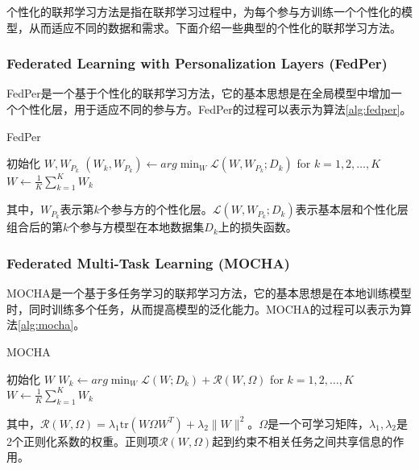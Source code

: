 个性化的联邦学习方法是指在联邦学习过程中，为每个参与方训练一个个性化的模型，从而适应不同的数据和需求。下面介绍一些典型的个性化的联邦学习方法。

\subsubsection{Federated Learning with Personalization Layers (FedPer)}

FedPer\cite{arivazhagan2019federated}是一个基于个性化的联邦学习方法，它的基本思想是在全局模型中增加一个个性化层，用于适应不同的参与方。FedPer的过程可以表示为算法\ref{alg:fedper}。

\begin{algorithm}[htbp]
\caption{FedPer}
\label{alg:fedper}
\begin{algorithmic}[1]
    \State 初始化 $W,W_{P_k}$
        \State $(W_k,W_{P_k}) \leftarrow arg\min_W \mathcal{L}(W,W_{P_k};D_k)$ for $k=1,2,\ldots,K$
        \State $W \leftarrow \frac{1}{K}\sum_{k=1}^K W_k$
    \EndFor
\end{algorithmic}
\end{algorithm}

其中，$W_{P_k}$表示第$k$个参与方的个性化层。$\mathcal{L}(W,W_{P_k};D_k)$表示基本层和个性化层组合后的第$k$个参与方模型在本地数据集$D_k$上的损失函数。

\subsubsection{Federated Multi-Task Learning (MOCHA)}

MOCHA\cite{smith2017federated}是一个基于多任务学习的联邦学习方法，它的基本思想是在本地训练模型时，同时训练多个任务，从而提高模型的泛化能力。MOCHA的过程可以表示为算法\ref{alg:mocha}。

\begin{algorithm}[htbp]
\caption{MOCHA}
\label{alg:mocha}
\begin{algorithmic}[1]
    \State 初始化 $W$
        \State $W_k \leftarrow arg\min_W \mathcal{L}(W;D_k)+\mathcal{R}(W,\Omega)$ for $k=1,2,\ldots,K$
        \State $W \leftarrow \frac{1}{K}\sum_{k=1}^K W_k$
    \EndFor
\end{algorithmic}
\end{algorithm}

其中，$\mathcal{R}(W,\Omega)=\lambda_1\text{tr}(W\Omega W^T)+\lambda_2\| W\|^2$。$\Omega$是一个可学习矩阵，$\lambda_1,\lambda_2$是2个正则化系数的权重。正则项$\mathcal{R}(W,\Omega)$起到约束不相关任务之间共享信息的作用。

